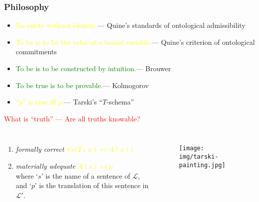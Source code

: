 \documentclass[UTF8,11pt,colorlinks,compress,openany]{beamer}%
\begin{document}
\begin{frame}\frametitle{Philosophy}
	\begin{itemize}
		\item \textcolor{yellow}{No entity without identity.}\hfill --- Quine's standards of ontological admissibility
		\item \textcolor{yellow}{To be is to be the value of a bound variable.}\hfill --- Quine's criterion of ontological commitments
		\item \textcolor{green}{To be is to be constructed by intuition.}\hfill --- Brouwer
		\item \textcolor{green}{To be true is to be provable.}\hfill --- Kolmogorov
		\item \textcolor{yellow}{``$p$'' is true iff $p$.}\hfill --- Tarski's ``$T$-schema''
	\end{itemize}
			\begin{block}{}
				\centering\textcolor{red}{What is ``truth'' --- Are all truths knowable?}
			\end{block}\vspace{-2ex}
	\begin{columns}
			\begin{enumerate}
				\item \emph{formally correct} \textcolor{yellow}{$\forall x\big(T(x)\leftrightarrow A(x)\big)$}
				\item \emph{materially adequate} \textcolor{yellow}{$A(s)\leftrightarrow p$}\\
				where `$s$' is the name of a sentence of $\mathscr{L}$, and `$p$' is the translation of this sentence
				in $\mathscr{L}'$.
			\end{enumerate}
			\begin{figure}
				\texttt{[image: img/tarski-painting.jpg]}
			\end{figure}
	\end{columns}
\end{frame}
\end{document}
